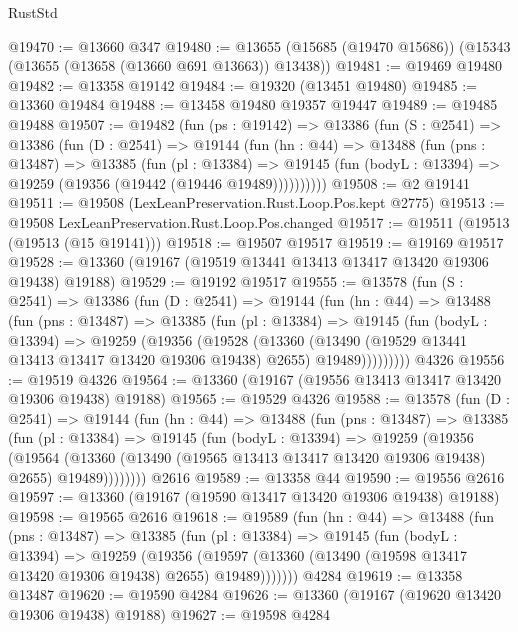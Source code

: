 \begin{lexlean}{RustStd}
\begin{coremodule}
@19470 := @13660 @347
@19480 := @13655 (@15685 (@19470 @15686)) (@15343 (@13655 (@13658 (@13660 @691 @13663)) @13438))
@19481 := @19469 @19480
@19482 := @13358 @19142
@19484 := @19320 (@13451 @19480)
@19485 := @13360 @19484
@19488 := @13458 @19480 @19357 @19447
@19489 := @19485 @19488
@19507 := @19482
    (fun (ps : @19142) =>
    @13386
      (fun (S : @2541) =>
      @13386
        (fun (D : @2541) =>
        @19144
          (fun (hn : @44) =>
          @13488
            (fun (pns : @13487) =>
            @13385
              (fun (pl : @13384) =>
              @19145 (fun (bodyL : @13394) => @19259 (@19356 (@19442 (@19446 @19489))))))))))
@19508 := @2 @19141
@19511 := @19508 (LexLeanPreservation.Rust.Loop.Pos.kept @2775)
@19513 := @19508 LexLeanPreservation.Rust.Loop.Pos.changed
@19517 := @19511 (@19513 (@19513 (@15 @19141)))
@19518 := @19507 @19517
@19519 := @19169 @19517
@19528 := @13360 (@19167 (@19519 @13441 @13413 @13417 @13420 @19306 @19438) @19188)
@19529 := @19192 @19517
@19555 := @13578
    (fun (S : @2541) =>
    @13386
      (fun (D : @2541) =>
      @19144
        (fun (hn : @44) =>
        @13488
          (fun (pns : @13487) =>
          @13385
            (fun (pl : @13384) =>
            @19145
              (fun (bodyL : @13394) =>
              @19259
                (@19356
                  (@19528
                    (@13360
                      (@13490 (@19529 @13441 @13413 @13417 @13420 @19306 @19438) @2655)
                      @19489)))))))))
    @4326
@19556 := @19519 @4326
@19564 := @13360 (@19167 (@19556 @13413 @13417 @13420 @19306 @19438) @19188)
@19565 := @19529 @4326
@19588 := @13578
    (fun (D : @2541) =>
    @19144
      (fun (hn : @44) =>
      @13488
        (fun (pns : @13487) =>
        @13385
          (fun (pl : @13384) =>
          @19145
            (fun (bodyL : @13394) =>
            @19259
              (@19356
                (@19564
                  (@13360 (@13490 (@19565 @13413 @13417 @13420 @19306 @19438) @2655) @19489))))))))
    @2616
@19589 := @13358 @44
@19590 := @19556 @2616
@19597 := @13360 (@19167 (@19590 @13417 @13420 @19306 @19438) @19188)
@19598 := @19565 @2616
@19618 := @19589
    (fun (hn : @44) =>
    @13488
      (fun (pns : @13487) =>
      @13385
        (fun (pl : @13384) =>
        @19145
          (fun (bodyL : @13394) =>
          @19259
            (@19356
              (@19597 (@13360 (@13490 (@19598 @13417 @13420 @19306 @19438) @2655) @19489)))))))
    @4284
@19619 := @13358 @13487
@19620 := @19590 @4284
@19626 := @13360 (@19167 (@19620 @13420 @19306 @19438) @19188)
@19627 := @19598 @4284

\end{coremodule}
\end{lexlean}
